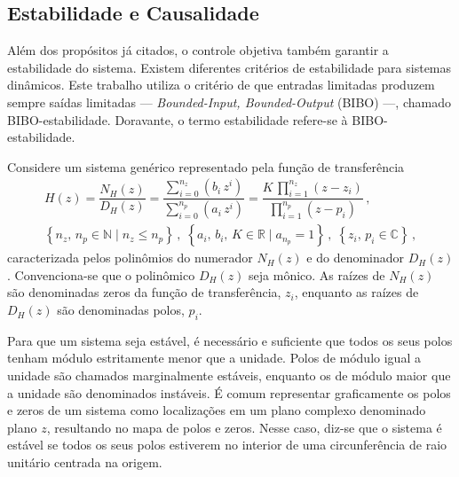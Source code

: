 \documentclass[repeatfields,oneside]{tcc}
\newcommand{\mycdot}{ \, }
\begin{document}
\subsection{Estabilidade e Causalidade}

Além dos propósitos já citados, o controle objetiva também garantir a estabilidade do sistema.
Existem diferentes critérios de estabilidade para sistemas dinâmicos.
Este trabalho utiliza o critério de que entradas limitadas produzem sempre saídas limitadas --- \textit{Bounded-Input, Bounded-Output} (BIBO) ---, chamado BIBO-estabilidade.
Doravante, o termo estabilidade refere-se à BIBO-estabilidade.

Considere um sistema genérico representado pela função de transferência
\begin{equation}\label{eq:stability_H}
\begin{gathered}
    H(z) = \dfrac{ N_H(z) }{ D_H(z) }
         = \dfrac{ \sum_{i = 0}^{n_z} \left( b_i \mycdot z^i \right) }{ \sum_{i = 0}^{n_p} \left( a_i \mycdot z^i \right) }
         = \dfrac{ K \mycdot \prod_{i = 1}^{n_z} (z - z_i) }{ \prod_{i = 1}^{n_p} (z - p_i) }
        \,,
        \\
        \left\{ n_z,\, n_p \in \mathbb{N} \mid n_z \leq n_p \right\}
        \,,\;
        \left\{ a_i,\, b_i,\, K \in \mathbb{R} \mid a_{n_p} = 1 \right\}
        \,,\;
        \left\{ z_i,\, p_i \in \mathbb{C} \right\}
        \,,
\end{gathered}
\end{equation}
caracterizada pelos polinômios do numerador $N_H(z)$ e do denominador $D_H(z)$.
Con\-ven\-ci\-o\-na\--se que o polinômico $D_H(z)$ seja mônico.
As raízes de $N_H(z)$ são denominadas zeros da função de transferência, $z_i$, enquanto as raízes de $D_H(z)$ são denominadas polos, $p_i$.

Para que um sistema seja estável, é necessário e suficiente que todos os seus polos tenham módulo estritamente menor que a unidade.
Polos de módulo igual a unidade são chamados marginalmente estáveis, enquanto os de módulo maior que a unidade são denominados instáveis.
É comum representar graficamente os polos e zeros de um sistema como localizações em um plano complexo denominado plano $z$, resultando no mapa de polos e zeros.
Nesse caso, diz-se que o sistema é estável se todos os seus polos estiverem no interior de uma circunferência de raio unitário centrada na origem.
\end{document}
